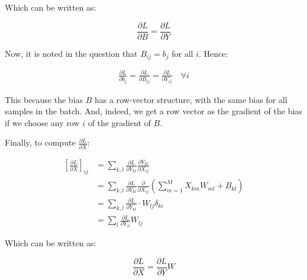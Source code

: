\documentclass{article}
\begin{document}
Which can be written as:

\begin{equation}
    \frac{\partial L}{\partial B} = \frac{\partial L}{\partial Y}
\end{equation}

Now, it is noted in the question that $B_{ij} = b_j$ for all $i$. Hence:

\begin{align*}
    \frac{\partial L}{\partial b_j} = \frac{\partial L}{\partial B_{ij}} = \frac{\partial L}{\partial Y_{ij}} \quad \forall i
\end{align*}

This because the bias $B$ has a row-vector structure, with the same bias for all samples in the batch. And, indeed,
we get a row vector as the gradient of the bias if we choose any row $i$ of the gradient of $B$.


Finally, to compute $\frac{\partial L}{\partial X}$:

\begin{align*}
    \left[ \frac{\partial L}{\partial X} \right]_{ij} &= \sum_{k, l} \frac{\partial L}{\partial Y_{kl}} \frac{\partial Y_{kl}}{\partial X_{ij}} \\
    &= \sum_{k, l} \frac{\partial L}{\partial Y_{kl}} \frac{\partial}{\partial X_{ij}} \left( \sum_{m=1}^{M} X_{km} W_{ml} + B_{kl} \right) \\
    &= \sum_{k, l} \frac{\partial L}{\partial Y_{kl}} \cdot W_{lj} \delta_{ki} \\
    &= \sum_{l} \frac{\partial L}{\partial Y_{il}} W_{lj}
\end{align*}


Which can be written as:

\begin{equation}
    \frac{\partial L}{\partial X} = \frac{\partial L}{\partial Y} W
\end{equation}
\end{document}
